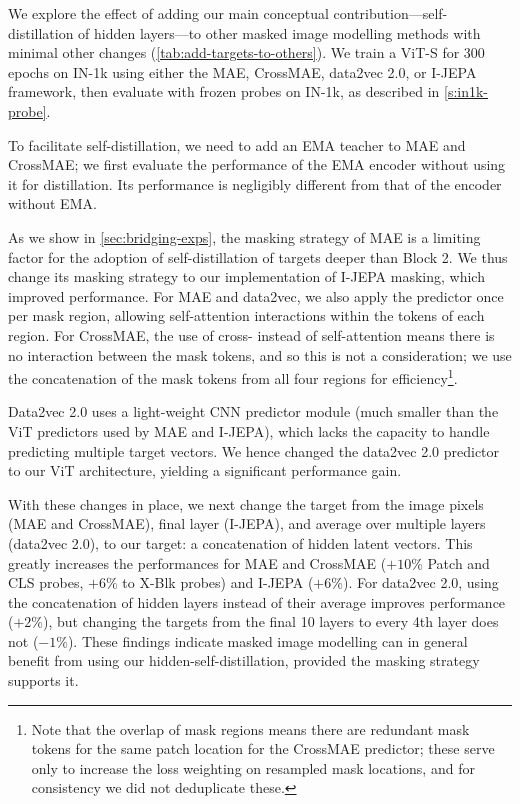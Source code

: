 We explore the effect of adding our main conceptual contribution---self-distillation of hidden layers---to other masked image modelling methods with minimal other changes (\cref{tab:add-targets-to-others}).
We train a ViT-S for 300 epochs on IN-1k using either the MAE, CrossMAE, data2vec 2.0, or I-JEPA framework, then evaluate with frozen probes on IN-1k, as described in \cref{s:in1k-probe}.

 To facilitate self-distillation, we need to add an EMA teacher to MAE and CrossMAE; we first evaluate the performance of the EMA encoder without using it for distillation.
Its performance is negligibly different from that of the encoder without EMA.

 As we show in \cref{sec:bridging-exps}, the masking strategy of MAE is a limiting factor for the adoption of self-distillation of targets deeper than Block 2.
We thus change its masking strategy to our implementation of I-JEPA masking, which improved performance.
For MAE and data2vec, we also apply the predictor once per mask region, allowing self-attention interactions within the tokens of each region.
For CrossMAE, the use of cross- instead of self-attention means there is no interaction between the mask tokens, and so this is not a consideration; we use the concatenation of the mask tokens from all four regions for efficiency\footnote{Note that the overlap of mask regions means there are redundant mask tokens for the same patch location for the CrossMAE predictor; these serve only to increase the loss weighting on resampled mask locations, and for consistency we did not deduplicate these.}.

Data2vec 2.0 uses a light-weight CNN predictor module (much smaller than the ViT predictors used by MAE and I-JEPA), which lacks the capacity to handle predicting multiple target vectors.
We hence changed the data2vec 2.0 predictor to our ViT architecture, yielding a significant performance gain.

 With these changes in place, we next change the target from the image pixels (MAE and CrossMAE), final layer (I-JEPA), and average over multiple layers (data2vec 2.0), to our target: a concatenation of hidden latent vectors.
This greatly increases the performances for MAE and CrossMAE ($+10\%$ Patch and CLS probes, $+6\%$ to X-Blk probes) and I-JEPA ($+6\%$).
For data2vec 2.0, using the concatenation of hidden layers instead of their average improves performance ($+2\%$), but changing the targets from the final 10 layers to every 4th layer does not ($-1\%$).
These findings indicate masked image modelling can in general benefit from using our hidden-self-distillation, provided the masking strategy supports it.



